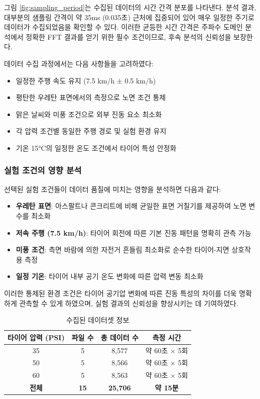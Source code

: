 \documentclass[12pt,a4paper]{article}
\begin{document}
그림 \ref{fig:sampling_period}는 수집된 데이터의 시간 간격 분포를 나타낸다. 분석 결과, 대부분의 샘플링 간격이 약 35ms (0.035초) 근처에 집중되어 있어 매우 일정한 주기로 데이터가 수집되었음을 확인할 수 있다. 이러한 균등한 시간 간격은 주파수 도메인 분석에서 정확한 FFT 결과를 얻기 위한 필수 조건이므로, 후속 분석의 신뢰성을 보장한다.

데이터 수집 과정에서는 다음 사항들을 고려하였다:
\begin{itemize}
    \item 일정한 주행 속도 유지 (7.5 km/h ± 0.5 km/h)
    \item 평탄한 우레탄 표면에서의 측정으로 노면 조건 통제
    \item 맑은 날씨와 미풍 조건으로 외부 진동 요소 최소화
    \item 각 압력 조건별 동일한 주행 경로 및 실험 환경 유지
    \item 기온 15°C의 일정한 온도 조건에서 타이어 특성 안정화
\end{itemize}

\subsubsection{실험 조건의 영향 분석}
\label{subsubsec:condition_impact}

선택된 실험 조건들이 데이터 품질에 미치는 영향을 분석하면 다음과 같다:

\begin{itemize}
    \item \textbf{우레탄 표면}: 아스팔트나 콘크리트에 비해 균일한 표면 거칠기를 제공하여 노면 변수를 최소화
    \item \textbf{저속 주행 (7.5 km/h)}: 타이어 회전에 따른 기본 진동 패턴을 명확히 관측 가능
    \item \textbf{미풍 조건}: 측면 바람에 의한 자전거 흔들림 최소화로 순수한 타이어-지면 상호작용 측정
    \item \textbf{일정 기온}: 타이어 내부 공기 온도 변화에 따른 압력 변동 최소화
\end{itemize}

이러한 통제된 환경 조건은 타이어 공기압 변화에 따른 진동 특성의 차이를 더욱 명확하게 관측할 수 있게 하였으며, 실험 결과의 신뢰성을 향상시키는 데 기여하였다.


\begin{table}[H]
    \centering
    \caption{수집된 데이터셋 정보}
    \label{tab:dataset_info}
    \begin{tabular}{@{}cccc@{}}
        \toprule
        타이어 압력 (PSI) & 파일 수 & 총 데이터 수 & 측정 시간 \\
        \midrule
        35 & 5 & 8,577 & 약 60초 × 5회 \\
        50 & 5 & 8,566 & 약 60초 × 5회 \\
        60 & 5 & 8,563 & 약 60초 × 5회 \\
        \midrule
        \textbf{전체} & \textbf{15} & \textbf{25,706} & \textbf{약 15분} \\
        \bottomrule
    \end{tabular}
\end{table}
\end{document}
